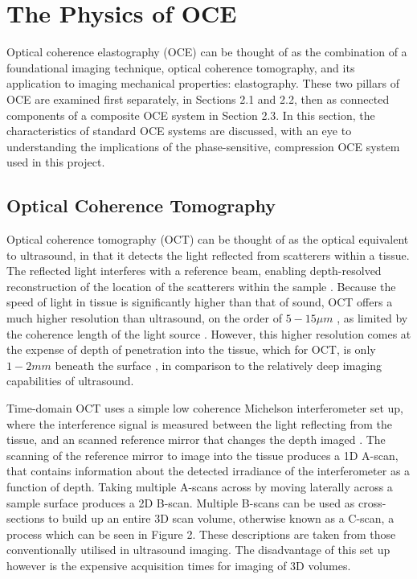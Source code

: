 \chapter{The Physics of OCE}

Optical coherence elastography (OCE) can be thought of as the combination of a foundational imaging technique, optical coherence tomography, and its application to imaging mechanical properties: elastography. These two pillars of OCE are examined first separately, in Sections 2.1 and 2.2, then as connected components of a composite OCE system in Section 2.3. In this section, the characteristics of standard OCE systems are discussed, with an eye to understanding the implications of the phase-sensitive, compression OCE system used in this project.

\section{Optical Coherence Tomography}
Optical coherence tomography (OCT) can be thought of as the optical equivalent to ultrasound, in that it detects the light reflected from scatterers within a tissue. The reflected light interferes with a reference beam, enabling depth-resolved reconstruction of the location of the scatterers within the sample \cite{chin_parametric_2016}. Because the speed of light in tissue is significantly higher than that of sound, OCT offers a much higher resolution than ultrasound, on the order of $5-15 \mu m$ \cite{kennedy_emergence_2017}, as limited by the coherence length of the light source \cite{huang_optical_1991}. However, this higher resolution comes at the expense of depth of penetration into the tissue, which for OCT, is only $1-2mm$ beneath the surface \cite{schmitt_optical_1999}, in comparison to the relatively deep imaging capabilities of ultrasound.

Time-domain OCT uses a simple low coherence Michelson interferometer set up, where the interference signal is measured between the light reflecting from the tissue, and an scanned reference mirror that changes the depth imaged \cite{huang_optical_1991}. The scanning of the reference mirror to image into the tissue produces a 1D A-scan, that contains information about the detected irradiance of the interferometer as a function of depth. Taking multiple A-scans across by moving laterally across a sample surface produces a 2D B-scan. Multiple B-scans can be used as cross-sections to build up an entire 3D scan volume, otherwise known as a C-scan, a process which can be seen in Figure 2. These descriptions are taken from those conventionally utilised in ultrasound imaging. The disadvantage of this set up however is the expensive acquisition times for imaging of 3D volumes.

